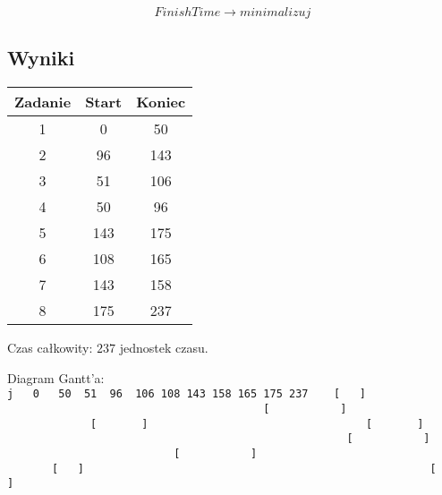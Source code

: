 \documentclass[polish,12pt,titlepage]{article}
\begin{document}
$$FinishTime \rightarrow minimalizuj$$

\subsection{Wyniki}

\begin{center}
\begin{tabular}{ | c | c | c | }
	\hline
	Zadanie & Start & Koniec \\
	\hline
	1 & 0   & 50  \\
	2 & 96  & 143 \\
	3 & 51  & 106 \\
	4 & 50  & 96  \\
	5 & 143 & 175 \\
	6 & 108 & 165 \\
	7 & 143 & 158 \\
	8 & 175 & 237 \\
	\hline
\end{tabular}
\end{center}

\begin{center}
Czas całkowity: $237$ jednostek czasu.
\end{center}

\begin{center}
Diagram Gantt'a:
\texttt{
j~~~0~~~50~~51~~96~~106~108~143~158~165~175~237~~~~[~~~]~~~~~~~~~~~~~~~~~~~~~~~~~~~~~~~~~~~~~~~~~~~~~~~~~~~~~~[~~~~~~~~~~~]~~~~~~~~~~~~~~~~~~~~~~~~~~~~~~[~~~~~~~]~~~~~~~~~~~~~~~~~~~~~~~~~~~~~~~~~~[~~~~~~~]~~~~~~~~~~~~~~~~~~~~~~~~~~~~~~~~~~~~~~~~~~~~~~~~~~~~~~~~~~[~~~~~~~~~~~]~~~~~~~~~~~~~~~~~~~~~~~~~~~~~~[~~~~~~~~~~~]~~~~~~~~~~~~~~~~~~~~~~~~~~~~~~~~~~~~~~[~~~]~~~~~~~~~~~~~~~~~~~~~~~~~~~~~~~~~~~~~~~~~~~~~~~~~~~~~~[~~~]~~~\linebreak
}
\end{center}
\end{document}
